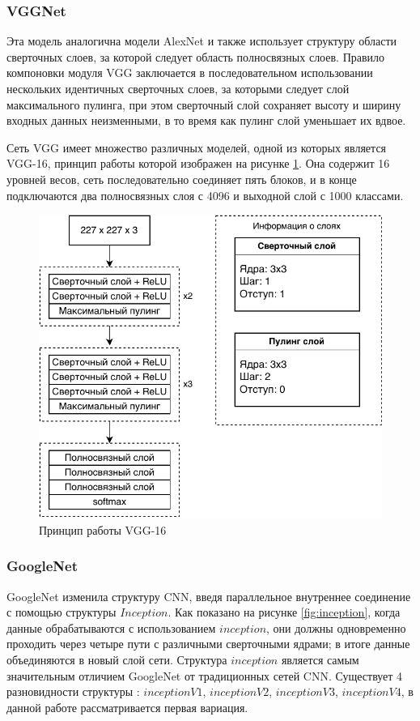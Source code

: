\subsubsection{VGGNet}
Эта модель аналогична модели AlexNet и также использует структуру области сверточных слоев, за которой следует область полносвязных слоев. Правило компоновки модуля VGG заключается в последовательном использовании нескольких идентичных сверточных слоев, за которыми следует слой максимального пулинга, при этом сверточный слой сохраняет высоту и ширину входных данных неизменными, в то время как пулинг слой уменьшает их вдвое. 

Сеть VGG имеет множество различных моделей, одной из которых является VGG-16, принцип работы которой изображен на рисунке \ref{fig:vggnet}. Она содержит 16 уровней весов, сеть последовательно соединяет пять блоков, и в конце подключаются два полносвязных слоя с 4096 и выходной слой с 1000 классами.

\begin{figure}[H]
	\centering
	\includegraphics[width=\textwidth]{img/VGGNet.pdf}
	\caption{Принцип работы VGG-16}
	\label{fig:vggnet}
\end{figure}
\clearpage


\subsubsection{GoogleNet}
GoogleNet изменила структуру CNN, введя параллельное внутреннее соединение с помощью структуры $Inception$. Как показано на рисунке \ref{fig:inception}, когда данные обрабатываются с использованием $inception$, они должны одновременно проходить через четыре пути с различными сверточными ядрами; в итоге данные объединяются в новый слой сети. Структура $inception$ является самым значительным отличием GoogleNet от традиционных сетей CNN. Существует 4 разновидности структуры \cite{googlenet}: $inceptionV1$, $inceptionV2$, $inceptionV3$, $inceptionV4$, в данной работе рассматривается первая вариация.

